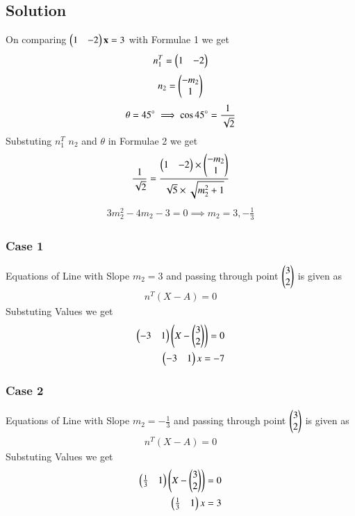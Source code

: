 \documentclass[journal,12pt,twocolumn]{IEEEtran}
\begin{document}
\subsection{Solution}
On comparing $\begin{pmatrix}1 & -2\end{pmatrix}\mathbf{x} = 3$ with Formulae 1  we get 
\begin{align}
    n_1^T=\begin{pmatrix}1 & -2\end{pmatrix}
\end{align}
\begin{align}
  n_2=\begin{pmatrix}-m_2\\1\end{pmatrix}  
\end{align}
\begin{align}
    \theta=45^\circ
    \implies \cos 45\degree &=\frac{1}{\sqrt{2}}\\ 
\end{align}
Substuting $n_1^T$ $n_2$ and $\theta$ in Formulae 2  we get
\begin{align}
    \frac{1}{\sqrt{2}}=\frac{\begin{pmatrix}1 & -2\end{pmatrix}\times\begin{pmatrix}-m_2\\1\end{pmatrix}}{\sqrt{5}\times\sqrt{m_2^2+1}}
\end{align}
\begin{align}
    3m_2^2-4m_2-3=0
    \implies m_2=3,-\frac{1}{3}
\end{align}
\subsubsection{Case 1}
Equations of Line with Slope $m_2=3$ and passing through point $\begin{pmatrix}3\\2\end{pmatrix}$ is given as
\begin{align}
  n^T(X-A)=0   
\end{align}
Substuting Values we get
\begin{align}
 \begin{pmatrix}-3 & 1\end{pmatrix}\begin{pmatrix}X-\begin{pmatrix}3\\2\end{pmatrix}\end{pmatrix}=0\\
 \begin{pmatrix}-3 & 1\end{pmatrix}x=-7
\end{align}
\subsubsection{Case 2}
Equations of Line with Slope $m_2=-\frac{1}{3}$ and passing through point $\begin{pmatrix}3\\2\end{pmatrix}$ is given as
\begin{align}
  n^T(X-A)=0   
\end{align}
Substuting Values we get
\begin{align}
 \begin{pmatrix}\frac{1}{3} & 1\end{pmatrix}\begin{pmatrix}X-\begin{pmatrix}3\\2\end{pmatrix}\end{pmatrix}=0\\
 \begin{pmatrix}\frac{1}{3} & 1\end{pmatrix}x=3
\end{align}
\end{document}
